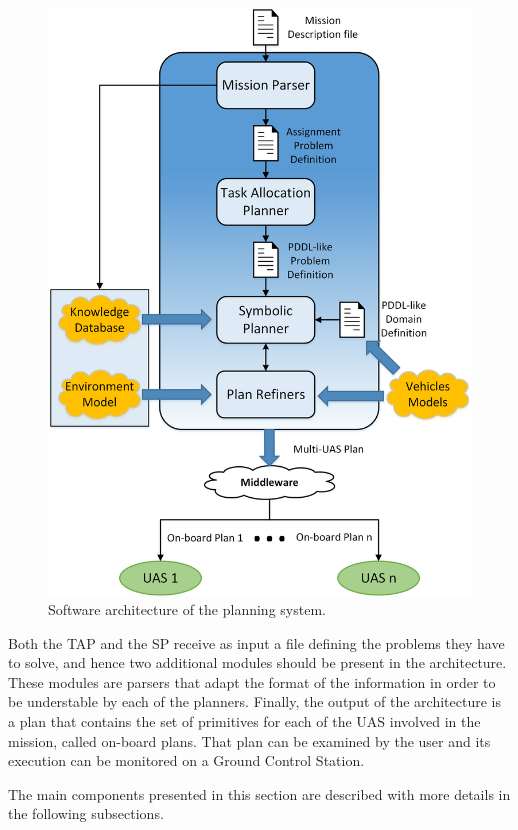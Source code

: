 \documentclass[twocolumn]{svjour3}          %
\begin{document}
\begin{figure}
    \centering
    \includegraphics[width=1.0\columnwidth]{global_arch.png}
    \caption[Software architecture of the planning system.]{Software architecture of the planning system.}
    \label{fig:global_arch}
\end{figure}

Both the TAP and the SP receive as input a file defining the problems they have to solve, and hence two additional modules should be present in the architecture. These modules are parsers that adapt the format of the information in order to be understable by each of the planners. Finally, the output of the architecture is a plan that contains the set of primitives for each of the UAS involved in the mission, called on-board plans. That plan can be examined by the user and its execution can be monitored on a Ground Control Station.

The main components presented in this section are described with more details in the following subsections.
\end{document}
